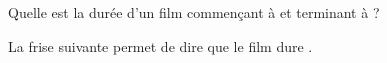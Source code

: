 \begin{exercice}
    Quelle est la durée d'un film commençant à  et terminant à
     ?
\end{exercice}
\begin{corrige}
    La frise suivante permet de dire que le film dure .
    \begin{center}
    \end{center}
\end{corrige}
